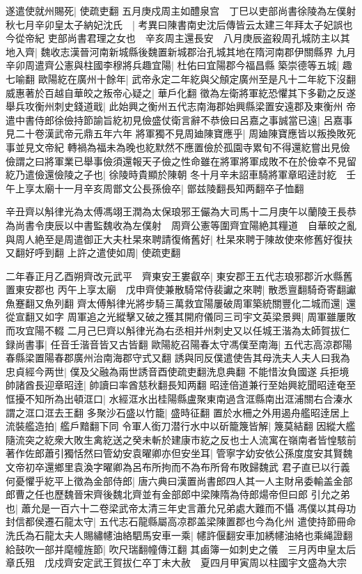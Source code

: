 遂遣使就州賜死|{
	使疏吏翻}
五月庚戍周主如醴泉宫　丁巳以吏部尚書徐陵為左僕射　秋七月辛卯皇太子納妃沈氏　|{
	考異曰陳書南史沈后傳皆云太建三年拜太子妃誤也今從帝紀}
吏部尚書君理之女也　辛亥周主還長安　八月庚辰盗殺周孔城防主以其地入齊|{
	魏收志漢晉河南新城縣後魏置新城郡治孔城其地在隋河南郡伊關縣界}
九月辛卯周遣齊公憲與柱國李穆將兵趣宜陽|{
	杜佑曰宜陽郡今福昌縣}
築崇德等五城|{
	趣七喻翻}
歐陽紇在廣州十餘年|{
	武帝永定二年紇與父頠定廣州至是凡十二年紇下沒翻}
威惠著於百越自華皎之叛帝心疑之|{
	華戶化翻}
徵為左衛將軍紇恐懼其下多勸之反遂舉兵攻衡州刺史錢道戢|{
	此始興之衡州五代志南海郡始興縣梁置安遠郡及東衡州}
帝遣中書侍郎徐儉持節諭旨紇初見儉盛仗衛言辭不恭儉曰呂嘉之事誠當已遠|{
	呂嘉事見二十卷漢武帝元鼎五年六年}
將軍獨不見周廸陳寶應乎|{
	周廸陳寶應皆以叛換敗死事並見文帝紀}
轉禍為福未為晚也紇默然不應置儉於孤園寺累旬不得還紇嘗出見儉儉謂之曰將軍業已舉事儉須還報天子儉之性命雖在將軍將軍成敗不在於儉幸不見留紇乃遣儉還儉陵之子也|{
	徐陵時貴顯於陳朝}
冬十月辛未詔車騎將軍章昭逹討紇　壬午上享太廟十一月辛亥周鄫文公長孫儉卒|{
	鄫兹陵翻長知两翻卒子恤翻}


辛丑齊以斛律光為太傅馮翊王潤為太保琅邪王儼為大司馬十二月庚午以蘭陵王長恭為尚書令庚辰以中書監魏收為左僕射　周齊公憲等圍齊宜陽絶其糧道　自華皎之亂與周人絶至是周遣御正大夫杜杲來聘請復脩舊好|{
	杜杲來聘于陳故使來修舊好復扶又翻好呼到翻}
上許之遣使如周|{
	使疏吏翻}


二年春正月乙酉朔齊改元武平　齊東安王婁叡卒|{
	東安郡王五代志琅邪郡沂水縣舊置東安郡也}
丙午上享太廟　戊申齊使兼散騎常侍裴讞之來聘|{
	散悉亶翻騎奇寄翻讞魚蹇翻又魚列翻}
齊太傅斛律光將步騎三萬救宜陽屢破周軍築統關豐化二城而還|{
	還從宣翻又如字}
周軍追之光縱擊又破之獲其開府儀同三司宇文英梁景興|{
	周軍雖屢敗而攻宜陽不輟}
二月己巳齊以斛律光為右丞相并州刺史又以任城王湝為太師賀拔仁録尚書事|{
	任音壬湝音皆又古皆翻}
歐陽紇召陽春太守馮僕至南海|{
	五代志高涼郡陽春縣梁置陽春郡廣州治南海郡守式又翻}
誘與同反僕遣使告其母洗夫人夫人曰我為忠貞經今两世|{
	僕及父融為兩世誘音酉使疏吏翻洗息典翻}
不能惜汝負國遂兵拒境帥諸酋長迎章昭逹|{
	帥讀曰率酋慈秋翻長知两翻}
昭逹倍道兼行至始興紇聞昭逹奄至恇擾不知所為出頓洭口|{
	水經洭水出桂陽縣盧聚東南過含洭縣南出洭浦關右合溱水謂之洭口洭去王翻}
多聚沙石盛以竹籠|{
	盛時征翻}
置於水柵之外用遏舟艦昭逹居上流裝艦造拍|{
	艦戶黯翻下同}
令軍人銜刀潜行水中以斫籠篾皆解|{
	篾莫結翻}
因縱大艦隨流突之紇衆大敗生禽紇送之癸未斬於建康市紇之反也士人流寓在嶺南者皆惶駭前著作佐郎蕭引獨恬然曰管幼安袁曜卿亦但安坐耳|{
	管寧字幼安依公孫度度安其賢魏文帝初卒還鄉里袁渙字曜卿為呂布所拘而不為布所脅布敗歸魏武}
君子直已以行義何憂懼乎紇平上徵為金部侍郎|{
	唐六典曰漢置尚書郎四人其一人主財帛委輸盖金部郎曹之任也歷魏晉宋齊後魏北齊並有金部郎中梁陳隋為侍郎煬帝但曰郎}
引允之弟也|{
	蕭允是一百六十二卷梁武帝太清三年史言蕭允兄弟處大難而不懾}
馮僕以其母功封信都侯遷石龍太守|{
	五代志石龍縣屬高凉郡盖梁陳置郡也今為化州}
遣使持節冊命洗氏為石龍太夫人賜繡幰油絡駟馬安車一乘|{
	幰許偃翻安車加綉幰油絡也乘䋲證翻}
給鼓吹一部并麾幢旌節|{
	吹尺瑞翻幢傳江翻}
其鹵簿一如刺史之儀　三月丙申皇太后章氏殂　戊戍齊安定武王賀拔仁卒丁未大赦　夏四月甲寅周以柱國宇文盛為大宗

